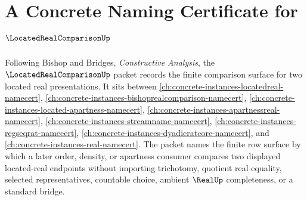 \chapter{A Concrete Naming Certificate for $\LocatedRealComparisonUp$}
\label{ch:concrete-instances-located-real-comparison-namecert}

Following Bishop and Bridges, \emph{Constructive Analysis}, the $\LocatedRealComparisonUp$ packet records the finite comparison surface for two located real presentations. It sits between \autoref{ch:concrete-instances-locatedreal-namecert}, \autoref{ch:concrete-instances-bishoprealcomparison-namecert}, \autoref{ch:concrete-instances-located-apartness-namecert}, \autoref{ch:concrete-instances-apartnessreal-namecert}, \autoref{ch:concrete-instances-streamname-namecert}, \autoref{ch:concrete-instances-regseqrat-namecert}, \autoref{ch:concrete-instances-dyadicratcore-namecert}, and \autoref{ch:concrete-instances-real-namecert}. The packet names the finite row surface by which a later order, density, or apartness consumer compares two displayed located-real endpoints without importing trichotomy, quotient real equality, selected representatives, countable choice, ambient $\RealUp$ completeness, or a standard bridge.

